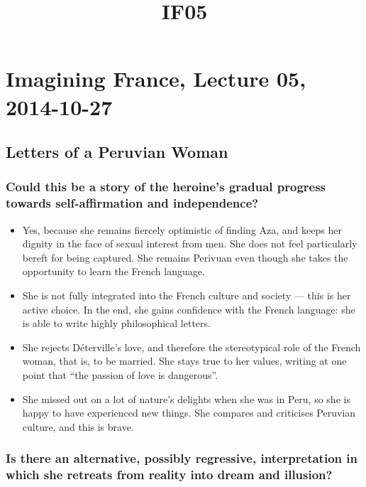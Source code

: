 \documentclass[12pt]{article}
\title{IF05}
\begin{document}
\section*{Imagining France, Lecture 05, 2014-10-27}

\subsection*{Letters of a Peruvian Woman}

\subsubsection*{Could this be a story of the heroine's gradual progress towards self-affirmation and independence?}

\begin{itemize}
  \item{Yes, because she remains fiercely optimistic of finding Aza, and keeps her dignity in the face of sexual interest from men. She does not feel particularly bereft for being captured. She remains Perivuan even though she takes the opportunity to learn the French language.}
  \item{She is not fully integrated into the French culture and society --- this is her active choice. In the end, she gains confidence with the French language: she is able to write highly philosophical letters.}
  \item{She rejects Déterville's love, and therefore the stereotypical role of the French woman, that is, to be married. She stays true to her values, writing at one point that ``the passion of love is dangerous''.}
  \item{She missed out on a lot of nature's delights when she was in Peru, so she is happy to have experienced new things. She compares and criticises Peruvian culture, and this is brave.}
\end{itemize}

\subsubsection*{Is there an alternative, possibly regressive, interpretation in which she retreats from reality into dream and illusion?}
\end{document}
